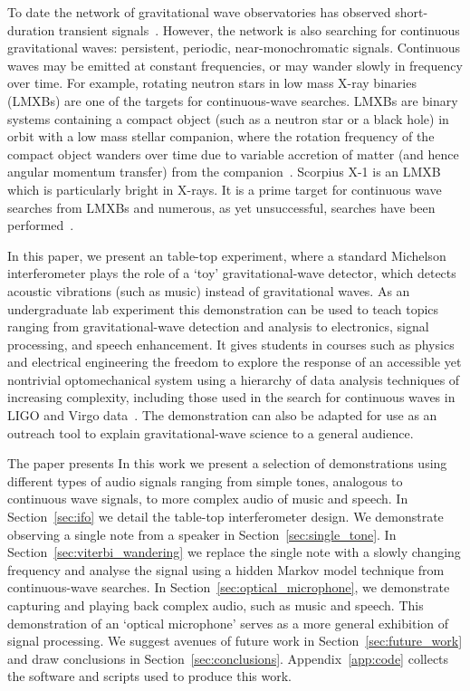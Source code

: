 \documentclass[paper-main.tex]{subfiles}
\begin{document}
To date the network of gravitational wave observatories has observed short-duration transient signals~\cite{GWTC-1:2018,GWOSC:online}. 
However, the network is also searching for continuous gravitational waves: persistent, periodic, near-monochromatic signals.
Continuous waves may be emitted at constant frequencies, or may wander slowly in frequency over time. 
For example, rotating neutron stars in low mass X-ray binaries (LMXBs) are one of the targets for continuous-wave searches. 
LMXBs are binary systems containing a compact object (such as a neutron star or a black hole) in orbit with a low mass stellar companion, where the rotation frequency of the compact object wanders over time due to variable accretion of matter (and hence angular momentum transfer) from the companion~\cite{xraybinaries:1997}. 
Scorpius X-1 is an LMXB which is particularly bright in X-rays. 
It is a prime target for continuous wave searches from LMXBs and numerous, as yet unsuccessful, searches have been performed~\cite{ScoX1O2Viterbi:2019,RadiometerO1O2:2019,SearchCrossCorrO1:2017}.


In this paper, we present an  table-top experiment, where a standard Michelson interferometer plays the role of a `toy' gravitational-wave detector, which detects acoustic vibrations (such as music) instead of gravitational waves. 
As an undergraduate lab experiment this demonstration can be used to teach topics ranging from gravitational-wave detection and analysis to electronics, signal processing, and speech enhancement. 
It gives students in courses such as physics and electrical engineering the freedom to explore the response of an accessible yet nontrivial optomechanical system using a hierarchy of data analysis techniques of increasing complexity, including those used in the search for continuous waves in LIGO and Virgo data~\cite{ScoX1O2Viterbi:2019,ScoX1ViterbiO1:2017,SuvorovaEtAl:2017,SuvorovaEtAl:2017}.
The demonstration can also be adapted for use as an outreach tool to explain gravitational-wave science to a general audience. 


The paper presents 
In this work we present a selection of demonstrations using different types of audio signals ranging from simple tones, analogous to continuous wave signals, to more complex audio of music and speech. 
In Section~\ref{sec:ifo} we detail the table-top interferometer design. 
We demonstrate observing a single note from a speaker in Section~\ref{sec:single_tone}.
In Section~\ref{sec:viterbi_wandering} we replace the single note with a slowly changing frequency and analyse the signal using a hidden Markov model technique from continuous-wave searches. 
In Section~\ref{sec:optical_microphone}, we demonstrate capturing and playing back complex audio, such as music and speech. 
This demonstration of an `optical microphone' serves as a more general exhibition of signal processing. 
We suggest avenues of future work in Section~\ref{sec:future_work} and draw conclusions in Section~\ref{sec:conclusions}.
Appendix~\ref{app:code} collects the software and scripts used to produce this work. 
\end{document}
